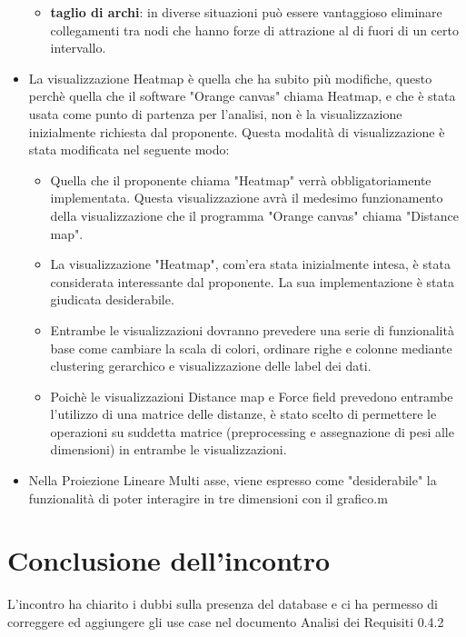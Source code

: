 \documentclass{article}
\begin{document}
\begin{itemize}
\begin {itemize}
			\item \textbf{taglio di archi}: in diverse situazioni può essere vantaggioso eliminare collegamenti tra nodi che hanno forze di attrazione al di fuori di un certo intervallo.
		\end {itemize}
		\item La visualizzazione Heatmap è quella che ha subito più modifiche, questo perchè quella che il software "Orange canvas" chiama Heatmap, e che è stata usata come punto di partenza per l'analisi, non è la visualizzazione inizialmente richiesta dal proponente. Questa modalità di visualizzazione è stata modificata nel seguente modo:
		\begin {itemize}
			\item Quella che il proponente chiama "Heatmap" verrà obbligatoriamente implementata. Questa visualizzazione avrà il medesimo funzionamento della visualizzazione che il programma "Orange canvas" chiama "Distance map".
			\item La visualizzazione "Heatmap", com'era stata inizialmente intesa, è stata considerata interessante dal proponente. La sua implementazione è stata giudicata desiderabile.
			\item Entrambe le visualizzazioni dovranno prevedere una serie di funzionalità base come cambiare la scala di colori, ordinare righe e colonne mediante clustering gerarchico e visualizzazione delle label dei dati.
			\item Poichè le visualizzazioni Distance map e Force field prevedono entrambe l'utilizzo di una matrice delle distanze, è stato scelto di permettere le operazioni su suddetta matrice (preprocessing e assegnazione di pesi alle dimensioni) in entrambe le visualizzazioni.
		\end {itemize}
		\item Nella Proiezione Lineare Multi asse, viene espresso come "desiderabile" la funzionalità di poter interagire in tre dimensioni con il grafico.m
	  \end{itemize}

\section{Conclusione dell'incontro}
\label{sec:conclusione}
L'incontro ha chiarito i dubbi sulla presenza del database e ci ha permesso di correggere ed aggiungere gli use case nel documento Analisi dei Requisiti 0.4.2
\end{document}
